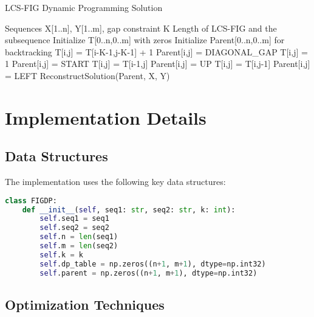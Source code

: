 \documentclass[12pt]{article}
\begin{document}
\begin{algorithm}
\caption{LCS-FIG Dynamic Programming Solution}
\begin{algorithmic}[1]
\Require Sequences X[1..n], Y[1..m], gap constraint K
\Ensure Length of LCS-FIG and the subsequence
\State Initialize T[0..n,0..m] with zeros
\State Initialize Parent[0..n,0..m] for backtracking
                \State T[i,j] = T[i-K-1,j-K-1] + 1
                \State Parent[i,j] = DIAGONAL\_GAP
            \Else
                \State T[i,j] = 1
                \State Parent[i,j] = START
            \EndIf
        \Else
                \State T[i,j] = T[i-1,j]
                \State Parent[i,j] = UP
            \Else
                \State T[i,j] = T[i,j-1]
                \State Parent[i,j] = LEFT
            \EndIf
        \EndIf
    \EndFor
\EndFor
\State \Return ReconstructSolution(Parent, X, Y)
\end{algorithmic}
\end{algorithm}

\section{Implementation Details}

\subsection{Data Structures}
The implementation uses the following key data structures:

\begin{lstlisting}[language=Python, caption=Core Data Structures]
class FIGDP:
    def __init__(self, seq1: str, seq2: str, k: int):
        self.seq1 = seq1
        self.seq2 = seq2
        self.n = len(seq1)
        self.m = len(seq2)
        self.k = k
        self.dp_table = np.zeros((n+1, m+1), dtype=np.int32)
        self.parent = np.zeros((n+1, m+1), dtype=np.int32)
\end{lstlisting}

\subsection{Optimization Techniques}
\end{document}
